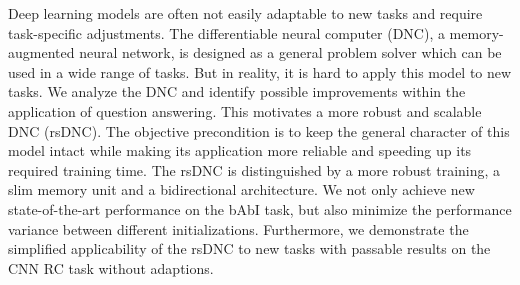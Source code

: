 Deep learning models are often not easily adaptable to new tasks and require task-specific adjustments. The differentiable neural computer (DNC), a memory-augmented neural network, is designed as a general problem solver which can be used in a wide range of tasks. But in reality, it is hard to apply this model to new tasks. We analyze the DNC and identify possible improvements within the application of question answering. This motivates a more robust and scalable DNC (rsDNC). The objective precondition is to keep the general character of this model intact while making its application more reliable and speeding up its required training time. The rsDNC is distinguished by a more robust training, a slim memory unit and a bidirectional architecture. We not only achieve new state-of-the-art performance on the bAbI task, but also minimize the performance variance between different initializations. Furthermore, we demonstrate the simplified applicability of the rsDNC to new tasks with passable results on the CNN RC task without adaptions.
